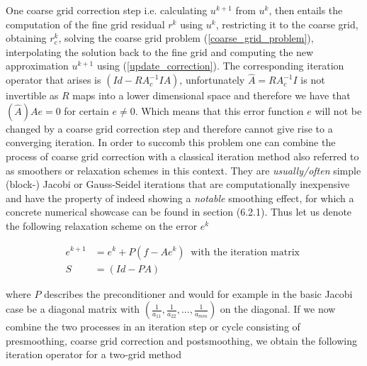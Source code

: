 \documentclass[../draft_1.tex]{subfiles}
\begin{document}
One coarse grid correction step i.e. calculating $u^{k+1}$ from $u^k$, then entails the computation of the fine grid residual $r^k$ using $u^k$, restricting it to the coarse grid, obtaining $r_c^k$, solving the coarse grid problem (\ref{coarse_grid_problem}), interpolating the solution back to the fine grid and computing the new approximation $u^{k+1}$ using (\ref{update_correction}). The corresponding iteration operator that arises is $(Id - R A_c^{-1} I A) $, unfortunately $\hat{A} = R A_c^{-1} I $ is not invertible as $R$ maps into a lower dimensional space and therefore we have that $(\hat{A}) A e = 0$ for certain $e \neq 0$. Which means that this error function $e$ will not be changed by a coarse grid correction step and therefore cannot give rise to a converging iteration. In order to succomb this problem one can combine the process of coarse grid correction with a classical iteration method also referred to as smoothers or relaxation schemes in this context. They are \textit{usually/often} simple (block-) Jacobi or Gauss-Seidel iterations that are computationally inexpensive and have the property of indeed showing a \textit{notable} smoothing effect, for which a concrete numerical showcase can be found in section (6.2.1). Thus let us denote the following relaxation scheme on the error $e^k$ 
\begin{ceqn}
	\begin{align}
e^{k+1} &= e^k + P(f - Ae^k) \ \text{ with the iteration matrix } \\
S &= (Id - PA)
	\end{align}
\end{ceqn}
where $P$ describes the preconditioner and would for example in the basic Jacobi case be a diagonal matrix with $(\frac{1}{a_{11}}, \frac{1}{a_{22}}, ..., \frac{1}{a_{mm}})$ on the diagonal. If we now combine the two processes in an iteration step or cycle consisting of presmoothing, coarse grid correction and postsmoothing, we obtain the following iteration operator for a two-grid method
\end{document}
